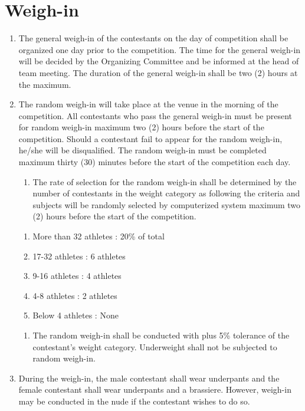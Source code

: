 \documentclass[
]{report}
\providecommand{\tightlist}{%
  \setlength{\itemsep}{0pt}\setlength{\parskip}{0pt}}
\renewcommand{\labelenumii}{\arabic{enumi}.\arabic{enumii}}
\begin{document}
\chapter{Weigh-in}\label{weigh-in}

\begin{enumerate}
\item
  The general weigh-in of the contestants on the day of competition
  shall be organized one day prior to the competition. The time for the
  general weigh-in will be decided by the Organizing Committee and be
  informed at the head of team meeting. The duration of the general
  weigh-in shall be two (2) hours at the maximum.
\item
  The random weigh-in will take place at the venue in the morning of the
  competition. All contestants who pass the general weigh-in must be
  present for random weigh-in maximum two (2) hours before the start of
  the competition. Should a contestant fail to appear for the random
  weigh-in, he/she will be disqualified. The random weigh-in must be
  completed maximum thirty (30) minutes before the start of the
  competition each day.

  \begin{enumerate}
  \tightlist
  \item
    The rate of selection for the random weigh-in shall be determined by
    the number of contestants in the weight category as following the
    criteria and subjects will be randomly selected by computerized
    system maximum two (2) hours before the start of the competition.
  \end{enumerate}

  \begin{enumerate}
  \def\labelenumii{\alph{enumii})}
  \tightlist
  \item
    More than 32 athletes : 20\% of total
  \item
    17-32 athletes : 6 athletes\\
  \item
    9-16 athletes : 4 athletes\\
  \item
    4-8 athletes : 2 athletes\\
  \item
    Below 4 athletes : None
  \end{enumerate}

  \begin{enumerate}
  \tightlist
  \item
    The random weigh-in shall be conducted with plus 5\% tolerance of
    the contestant's weight category. Underweight shall not be subjected
    to random weigh-in.
  \end{enumerate}
\item
  During the weigh-in, the male contestant shall wear underpants and the
  female contestant shall wear underpants and a brassiere. However,
  weigh-in may be conducted in the nude if the contestant wishes to do
  so.


\end{enumerate}
\end{document}
